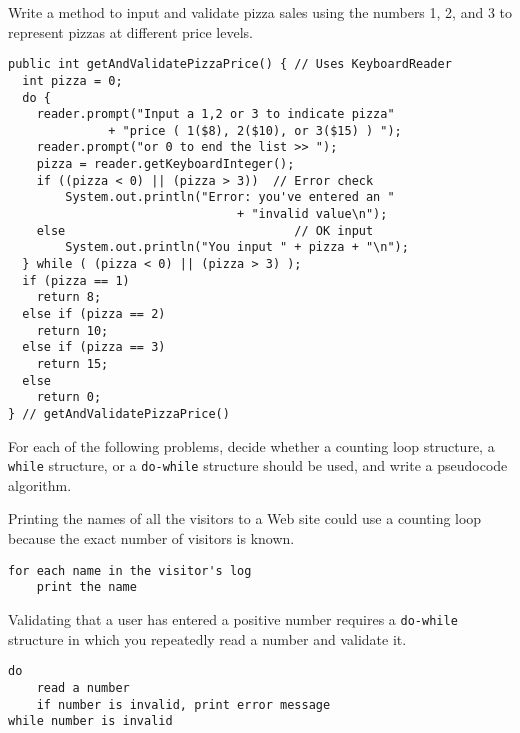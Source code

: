 \begin{ANS}
\item  Write a method to input and validate pizza sales using the numbers
1, 2, and 3 to represent pizzas at different price levels.

\begin{jjjlisting}
\begin{lstlisting}[basicstyle=\scriptsize]
public int getAndValidatePizzaPrice() { // Uses KeyboardReader
  int pizza = 0;
  do {
    reader.prompt("Input a 1,2 or 3 to indicate pizza" 
              + "price ( 1($8), 2($10), or 3($15) ) ");
    reader.prompt("or 0 to end the list >> ");
    pizza = reader.getKeyboardInteger();
    if ((pizza < 0) || (pizza > 3))  // Error check
        System.out.println("Error: you've entered an " 
                                + "invalid value\n");  
    else                                // OK input
        System.out.println("You input " + pizza + "\n"); 
  } while ( (pizza < 0) || (pizza > 3) );
  if (pizza == 1)
    return 8;
  else if (pizza == 2)
    return 10;
  else if (pizza == 3)
    return 15;
  else
    return 0;
} // getAndValidatePizzaPrice()
\end{lstlisting}
\end{jjjlisting}


\item  For each of the following problems, decide whether
a counting loop structure, a {\tt while} structure, or a
{\tt do-while} structure should be used, and write a
pseudocode algorithm.

\begin{ANSBL}
\item  Printing the names of all the visitors to
a Web site could use a counting loop because the
exact number of visitors is known.

\begin{jjjlisting}
\begin{lstlisting}[basicstyle=\scriptsize]
for each name in the visitor's log
    print the name
\end{lstlisting}
\end{jjjlisting}


\item  Validating that a user has entered a positive
number requires a {\tt do-while} structure in which
you repeatedly read a number and validate it.

\begin{jjjlisting}
\begin{lstlisting}[basicstyle=\scriptsize]
do
    read a number
    if number is invalid, print error message
while number is invalid
\end{lstlisting}
\end{jjjlisting}


\end{ANSBL}
\end{ANS}
